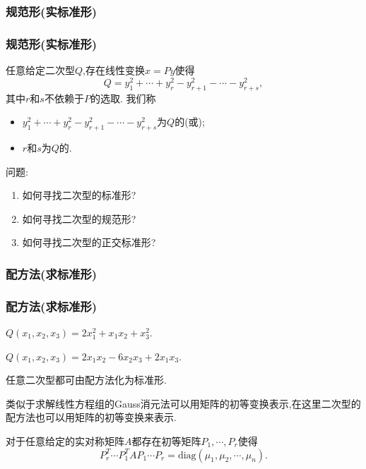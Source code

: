 \subsubsection{规范形(实标准形)}
\begin{frame}\frametitle{规范形(实标准形)}
\begin{theorem}
任意给定二次型$Q$,存在线性变换$x=Py$使得
\[Q=y_1^2+\cdots+y_r^2-y_{r+1}^2-\cdots-y_{r+s}^2,\]
其中$r$和$s$不依赖于$P$的选取. 我们称
\begin{itemize}
\item $y_1^2+\cdots+y_r^2-y_{r+1}^2-\cdots-y_{r+s}^2$为$Q$的(或);
\item $r$和$s$为$Q$的.
\end{itemize}
\end{theorem}
\pp
问题:\begin{enumerate}
\item 如何寻找二次型的标准形?
\pp
\item 如何寻找二次型的规范形?
\pp
\item 如何寻找二次型的正交标准形?
\end{enumerate}
\end{frame}





\subsubsection{配方法(求标准形)}
\begin{frame}\frametitle{配方法(求标准形)}

\begin{example}[含平方项]
$Q(x_1,x_2,x_3)=2x_1^2+x_1x_2+x_3^2$.
\end{example}
\pp
\begin{example}[无平方项]
$Q(x_1,x_2,x_3)=2x_1x_2-6x_2x_3+2x_1x_3$.
\end{example}
\pp
\begin{theorem}
任意二次型都可由配方法化为标准形.
\end{theorem}
\pp
{}

类似于求解线性方程组的Gauss消元法可以用矩阵的初等变换表示,在这里二次型的配方法也可以用矩阵的初等变换来表示.
\pp
\begin{theorem}[配方法能用矩阵实现的理论依据]
对于任意给定的实对称矩阵$A$都存在初等矩阵$P_1,\cdots,P_r$使得
\[P_r^T\cdots P_1^TAP_1\cdots P_r=\mathrm{diag}(\mu_1,\mu_2,\cdots,\mu_n).\]
\end{theorem}
\end{frame}





